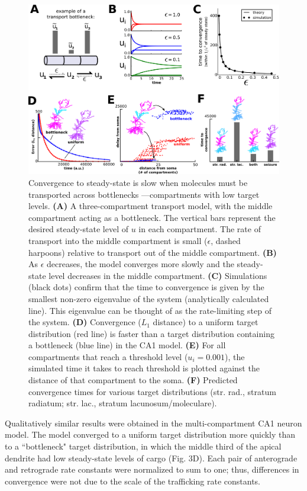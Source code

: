 \documentclass[11pt]{wlpeerj}
\begin{document}
\begin{figure}[!tb]
\begin{center}
\includegraphics[width=0.9\columnwidth]{03_convergence.png}
\caption{ Convergence to steady-state is slow when molecules must be transported across bottlenecks ---compartments with low target levels.
\textbf{(A)} A three-compartment transport model, with the middle compartment acting as a bottleneck. The vertical bars represent the desired steady-state level of $u$ in each compartment. The rate of transport into the middle compartment is small ($\epsilon$, dashed harpoons) relative to transport out of the middle compartment.
\textbf{(B)} As $\epsilon$ decreases, the model converges more slowly and the steady-state level decreases in the middle compartment.
\textbf{(C)} Simulations (black dots) confirm that the time to convergence is given by the smallest non-zero eigenvalue of the system (analytically calculated line). This eigenvalue can be thought of as the rate-limiting step of the system.
\textbf{(D)} Convergence ($L_1$ distance) to a uniform target distribution (red line) is faster than a target distribution containing a bottleneck (blue line) in the CA1 model.
\textbf{(E)} For all compartments that reach a threshold level ($u_i = 0.001$), the simulated time it takes to reach threshold is plotted against the distance of that compartment to the soma.
\textbf{(F)} Predicted convergence times for various target distributions (str. rad., stratum radiatum; str. lac., stratum lacunosum/moleculare).}
\end{center}
\end{figure}

Qualitatively similar results were obtained in the multi-compartment CA1 neuron model.
The model converged to a uniform target distribution more quickly than to a ``bottleneck" target distribution, in which the middle third of the apical dendrite had low steady-state levels of cargo (Fig. 3D).
Each pair of anterograde and retrograde rate constants were normalized to sum to one; thus, differences in convergence were not due to the scale of the trafficking rate constants.
\end{document}
